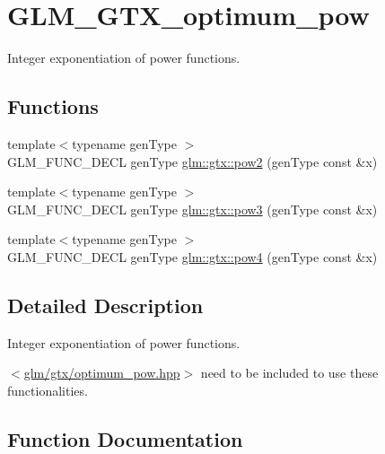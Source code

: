 \hypertarget{group__gtx__optimum__pow}{}\section{G\+L\+M\+\_\+\+G\+T\+X\+\_\+optimum\+\_\+pow}
\label{group__gtx__optimum__pow}


Integer exponentiation of power functions.  


\subsection*{Functions}
\begin{DoxyCompactItemize}
\item 
{\footnotesize template$<$typename gen\+Type $>$ }\\G\+L\+M\+\_\+\+F\+U\+N\+C\+\_\+\+D\+E\+C\+L gen\+Type \hyperlink{group__gtx__optimum__pow_ga19aaff3213bf23bdec3ef124ace237e9}{glm\+::gtx\+::pow2} (gen\+Type const \&x)
\item 
{\footnotesize template$<$typename gen\+Type $>$ }\\G\+L\+M\+\_\+\+F\+U\+N\+C\+\_\+\+D\+E\+C\+L gen\+Type \hyperlink{group__gtx__optimum__pow_ga35689d03cd434d6ea819f1942d3bf82e}{glm\+::gtx\+::pow3} (gen\+Type const \&x)
\item 
{\footnotesize template$<$typename gen\+Type $>$ }\\G\+L\+M\+\_\+\+F\+U\+N\+C\+\_\+\+D\+E\+C\+L gen\+Type \hyperlink{group__gtx__optimum__pow_gacef0968763026e180e53e735007dbf5a}{glm\+::gtx\+::pow4} (gen\+Type const \&x)
\end{DoxyCompactItemize}


\subsection{Detailed Description}
Integer exponentiation of power functions. 

$<$\hyperlink{optimum__pow_8hpp}{glm/gtx/optimum\+\_\+pow.\+hpp}$>$ need to be included to use these functionalities. 

\subsection{Function Documentation}
\hypertarget{group__gtx__optimum__pow_ga19aaff3213bf23bdec3ef124ace237e9}{}
